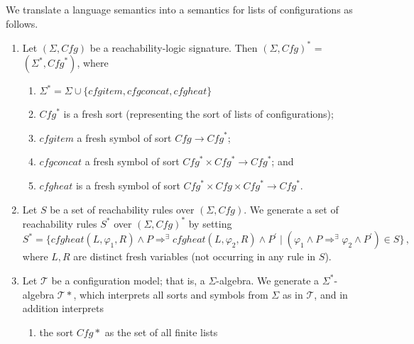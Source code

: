 \documentclass{article}
\begin{document}
\begin{definition}
We translate a language semantics into a semantics for lists of configurations as follows.
\begin{enumerate}
    \item Let $(\Sigma, \mathit{Cfg})$ be a reachability-logic signature.
          Then $(\Sigma, \mathit{Cfg})^*$ = $(\Sigma^*, \mathit{Cfg}^*)$,
          where
          \begin{enumerate}
              \item $\Sigma^* = \Sigma \cup \{ \mathit{cfgitem}, \mathit{cfgconcat},
          \mathit{cfgheat} \}$
              \item $\mathit{Cfg}^*$ is a fresh sort (representing the sort of lists of configurations);
              \item $\mathit{cfgitem}$ a fresh symbol of sort $\mathit{Cfg} \to \mathit{Cfg}^*$;
              \item $\mathit{cfgconcat}$ a fresh symbol of sort $\mathit{Cfg}^* \times \mathit{Cfg}^* \to \mathit{Cfg}^*$; and
              \item $\mathit{cfgheat}$ is a fresh symbol of sort $\mathit{Cfg}^* \times \mathit{Cfg} \times \mathit{Cfg}^* \to \mathit{Cfg}^*$.
          \end{enumerate}
    \item Let $S$ be a set of reachability rules over $(\Sigma, \mathit{Cfg})$.
          We generate a set of reachability rules $S^*$ over $(\Sigma, \mathit{Cfg})^*$
          by setting
          \begin{equation*}
              S^* = \{ \mathit{cfgheat}(L, \varphi_1, R) \land P \Rightarrow^\exists \mathit{cfgheat}(L, \varphi_2, R) \land P^\prime \mid (\varphi_1 \land P \Rightarrow^\exists \varphi_2 \land P^\prime) \in S \} \, ,
          \end{equation*}
          where $L,R$ are distinct fresh variables (not occurring in any rule in $S$).
    \item Let $\mathcal{T}$ be a configuration model; that is, a $\Sigma$-algebra.
          We generate a $\Sigma^*$-algebra $\mathcal{T}*$, which interprets all sorts and symbols from
          $\Sigma$ as in $\mathcal{T}$, and in addition interprets
          \begin{enumerate}
              \item the sort $\mathit{Cfg}*$ as the set of all finite lists

\end{enumerate}
\end{enumerate}
\end{definition}
\end{document}

